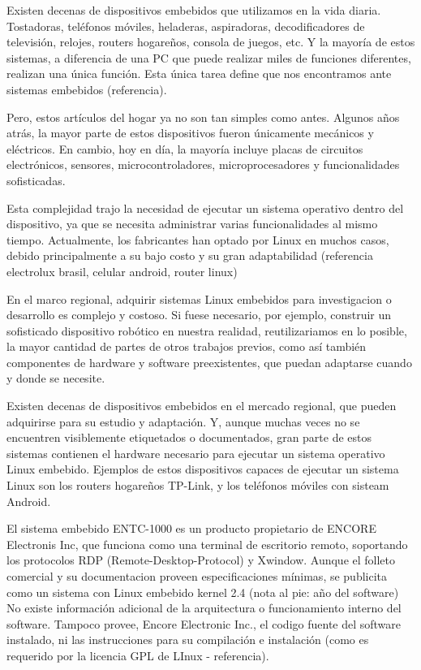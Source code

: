 \documentclass[conference]{IEEEtran}
\begin{document}
Existen decenas de dispositivos embebidos que utilizamos en la vida diaria.
Tostadoras, teléfonos móviles, heladeras, aspiradoras,
decodificadores de televisión, relojes, routers hogareños, consola de juegos, etc.
Y la mayoría de estos sistemas, a diferencia de una PC que puede
realizar miles de funciones diferentes, realizan una única función.
Esta única tarea define que nos encontramos ante sistemas embebidos (referencia).

Pero, estos artículos del hogar ya no son tan simples como antes. Algunos
años atrás, la mayor parte de estos dispositivos fueron únicamente mecánicos
y eléctricos. En cambio, hoy en día, la mayoría incluye placas
de circuitos electrónicos, sensores, microcontroladores, microprocesadores y
funcionalidades sofisticadas.

Esta complejidad trajo la necesidad de ejecutar un sistema operativo
dentro del dispositivo, ya
que se necesita administrar varias funcionalidades al mismo tiempo.
Actualmente, los fabricantes han optado por Linux en muchos
casos, debido principalmente a su
bajo costo y su gran adaptabilidad (referencia electrolux brasil, celular android, router linux)

En el marco regional, adquirir sistemas Linux embebidos para investigacion
o desarrollo es complejo y costoso.
Si fuese necesario, por ejemplo, construir un sofisticado dispositivo robótico
en nuestra realidad, reutilizariamos en lo posible, la mayor cantidad de partes de otros
trabajos previos, como así también componentes de hardware y software
preexistentes, que puedan adaptarse cuando y donde se necesite.

Existen decenas de dispositivos embebidos en el mercado regional,
que pueden adquirirse para su estudio y adaptación. Y,
aunque muchas veces no se encuentren visiblemente etiquetados o documentados,
gran parte de estos sistemas contienen el hardware necesario
para ejecutar un sistema operativo Linux embebido. Ejemplos de estos dispositivos
capaces de ejecutar un sistema Linux son los routers hogareños TP-Link,
y los teléfonos móviles con sisteam Android.

El sistema embebido ENTC-1000 es un producto propietario de ENCORE Electronis Inc,
que funciona como una terminal de escritorio remoto, soportando
los protocolos RDP (Remote-Desktop-Protocol) y Xwindow. Aunque el folleto
comercial y su documentacion proveen especificaciones mínimas,
se publicita como un sistema con Linux embebido kernel 2.4 (nota al pie: año del software)
No existe información adicional de la arquitectura o funcionamiento
interno del software. Tampoco provee, Encore Electronic Inc.,
el codigo fuente del software instalado, ni las instrucciones
para su compilación e instalación (como es requerido por la licencia GPL de LInux - referencia).
\end{document}

